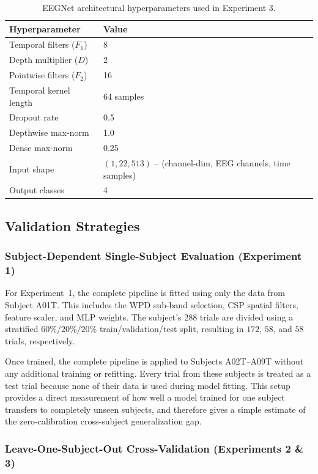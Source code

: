 \documentclass[11pt,a4paper]{article}
\begin{document}
\begin{table}[H]
	\centering
	\caption{EEGNet architectural hyperparameters used in Experiment 3.}
	\label{tab:eegnet-hparams}
	\begin{tabular}{ll}
		\toprule
		\textbf{Hyperparameter} & \textbf{Value} \\
		\midrule
		Temporal filters ($F_1$) & 8 \\
		Depth multiplier ($D$) & 2 \\
		Pointwise filters ($F_2$) & 16 \\
		Temporal kernel length & 64 samples \\
		Dropout rate & 0.5 \\
		Depthwise max-norm & 1.0 \\
		Dense max-norm & 0.25 \\
		Input shape & $(1, 22, 513)$ -- (channel-dim, EEG channels, time samples) \\
		Output classes & 4 \\
		\bottomrule
	\end{tabular}
\end{table}

\subsection{Validation Strategies}

\subsubsection{Subject-Dependent Single-Subject Evaluation (Experiment 1)}

For Experiment~1, the complete pipeline is fitted using only the data from Subject A01T. This
includes the WPD sub-band selection, CSP spatial filters, feature scaler, and MLP weights. The
subject's 288 trials are divided using a stratified $60\%/20\%/20\%$ train/validation/test split,
resulting in $172$, $58$, and $58$ trials, respectively.

Once trained, the complete pipeline is applied to Subjects A02T--A09T without any additional
training or refitting. Every trial from these subjects is treated as a test trial because none
of their data is used during model fitting. This setup provides a direct measurement of how well
a model trained for one subject transfers to completely unseen subjects, and therefore gives a
simple estimate of the zero-calibration cross-subject generalization gap.

\subsubsection{Leave-One-Subject-Out Cross-Validation (Experiments 2 \& 3)}
\end{document}
